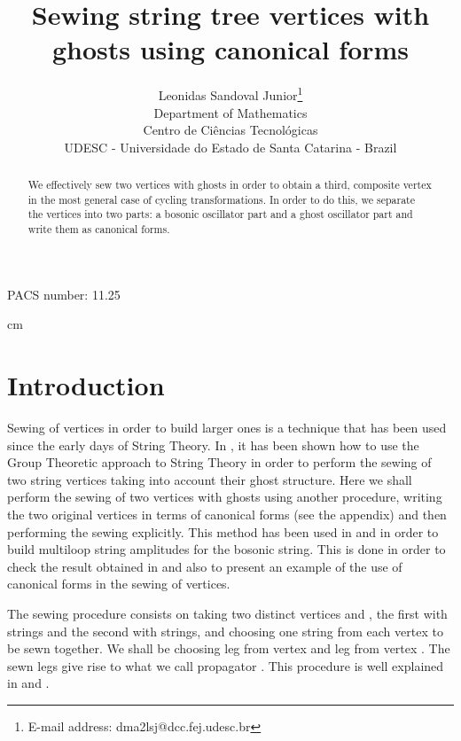 \documentclass[a4paper,11pt]{article}
\begin{document}
\title{Sewing string tree vertices with ghosts using canonical forms}

\author{Leonidas Sandoval Junior\thanks{E-mail address: dma2lsj@dcc.fej.udesc.br}\\ Department of Mathematics\\ Centro de Ci\^encias Tecnol\'ogicas\\ UDESC - Universidade do Estado de Santa Catarina - Brazil}

\maketitle 

\begin{abstract}
We effectively sew two vertices with ghosts in order to obtain a third, composite vertex in the most general case of cycling transformations. In order to do this, we separate the vertices into two parts: a bosonic oscillator part and a ghost oscillator part and write them as canonical forms.
\end{abstract}

\begin{flushright}\noindent PACS number: 11.25\end{flushright}

 cm 

\section{Introduction}

Sewing of vertices in order to build larger ones is a technique that has been used since the early days of String Theory. In \cite{ls1}, it has been shown how to use the Group Theoretic approach to String Theory \cite{pw1} in order to perform the sewing of two string vertices taking into account their ghost structure. Here we shall perform the sewing of two vertices with ghosts using another procedure, writing the two original vertices in terms of canonical forms (see the appendix) and then performing the sewing explicitly. This method has been used in \cite{cg1} and \cite{cg2} in order to build multiloop string amplitudes for the bosonic string. This is done in order to check the result obtained in \cite{ls1} and also to present an example of the use of canonical forms in the sewing of vertices.

The sewing procedure consists on taking two distinct vertices \coordHE{} and \coordHE{}, the first with \coordHE{} strings and the second with \coordHE{} strings, and choosing one string from each vertex to be sewn together. We shall be choosing leg \coordHE{} from vertex \coordHE{} and leg \coordHE{} from vertex \coordHE{}. The sewn legs give rise to what we call propagator \coordHE{}. This procedure is well explained in \cite{pw2} and \cite{ls1}.
\end{document}
